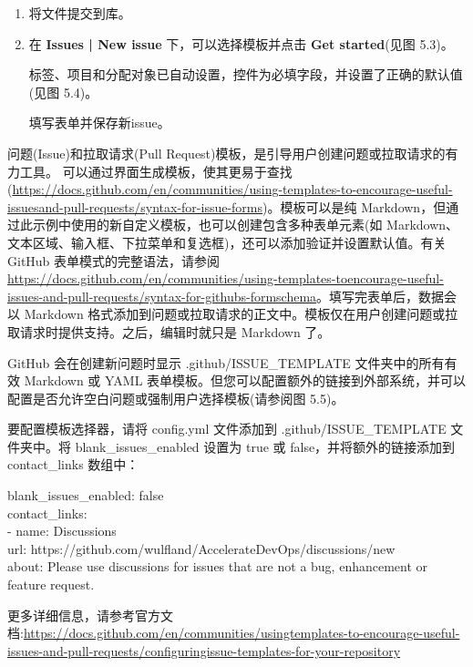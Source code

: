 \begin{enumerate}
\item 
将文件提交到库。

\item 
在 \textbf{Issues | New issue} 下，可以选择模板并点击 \textbf{Get started}(见图 5.3)。


标签、项目和分配对象已自动设置，控件为必填字段，并设置了正确的默认值(见图 5.4)。


填写表单并保存新issue。

\end{enumerate}


问题(Issue)和拉取请求(Pull Request)模板，是引导用户创建问题或拉取请求的有力工具。
可以通过界面生成模板，使其更易于查找(\url{https://docs.github.com/en/communities/using-templates-to-encourage-useful-issuesand-pull-requests/syntax-for-issue-forms})。模板可以是纯 Markdown，但通过此示例中使用的新自定义模板，也可以创建包含多种表单元素(如 Markdown、文本区域、输入框、下拉菜单和复选框)，还可以添加验证并设置默认值。有关 GitHub 表单模式的完整语法，请参阅 \url{https://docs.github.com/en/communities/using-templates-toencourage-useful-issues-and-pull-requests/syntax-for-githubs-formschema}。填写完表单后，数据会以 Markdown 格式添加到问题或拉取请求的正文中。模板仅在用户创建问题或拉取请求时提供支持。之后，编辑时就只是 Markdown 了。


GitHub 会在创建新问题时显示 .github/ISSUE\_TEMPLATE 文件夹中的所有有效 Markdown 或 YAML 表单模板。但您可以配置额外的链接到外部系统，并可以配置是否允许空白问题或强制用户选择模板(请参阅图 5.5)。


要配置模板选择器，请将 config.yml 文件添加到 .github/ISSUE\_TEMPLATE 文件夹中。将 blank\_issues\_enabled 设置为 true 或 false，并将额外的链接添加到 contact\_links 数组中：

\begin{tcolorbox}[ breakable,colback = bashcodebg, colframe= black!50!white]
\scriptsize{
blank\_issues\_enabled: false \\
contact\_links: \\
\hspace*{1em}- name:  Discussions \\
\hspace*{2.2em}url: https://github.com/wulfland/AccelerateDevOps/discussions/new \\
\hspace*{2.2em}about: Please use discussions for issues that are not a bug, enhancement or feature request.
}
\end{tcolorbox}

更多详细信息，请参考官方文档:\url{https://docs.github.com/en/communities/usingtemplates-to-encourage-useful-issues-and-pull-requests/configuringissue-templates-for-your-repository}


